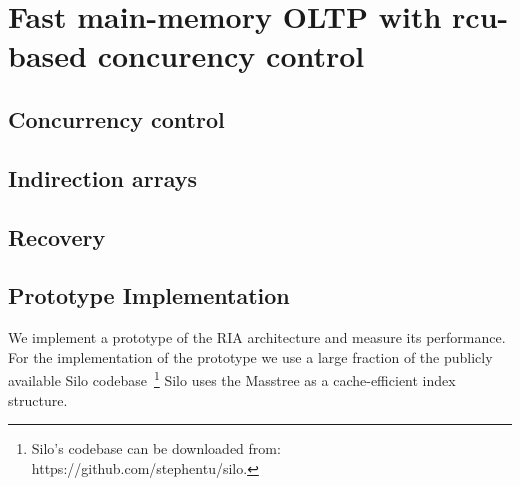 
\section{Fast main-memory OLTP with rcu-based concurency control}



\subsection{Concurrency control}

\subsection{Indirection arrays}

\subsection{Recovery}

\subsection{Prototype Implementation}

We implement a prototype of the RIA architecture and measure its performance.  For the implementation of the prototype we use a large fraction of the publicly available Silo codebase~\footnote{Silo's codebase can be downloaded from: https://github.com/stephentu/silo.} Silo uses the Masstree \cite{MaoKM12} as a cache-efficient index structure. 
